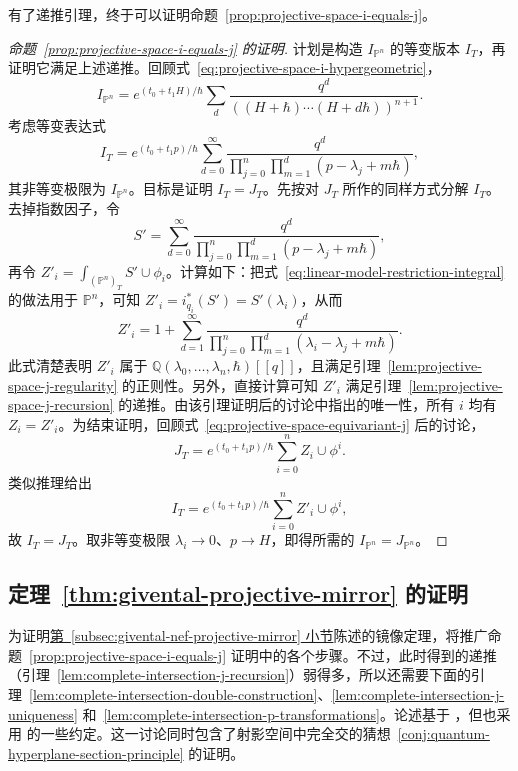有了递推引理，终于可以证明命题~\ref{prop:projective-space-i-equals-j}。
\begin{proof}[命题~\ref{prop:projective-space-i-equals-j} 的证明]
计划是构造 $I_{\mathbb P^n}$ 的等变版本 $I_T$，再证明它满足上述递推。回顾式~\eqref{eq:projective-space-i-hypergeometric}，
\[
I_{\mathbb P^n}=e^{(t_0+t_1H)/\hbar}\sum_d\frac{q^d}{((H+\hbar)\cdots(H+d\hbar))^{n+1}}.
\]
考虑等变表达式
\[
I_T=e^{(t_0+t_1p)/\hbar}\sum_{d=0}^{\infty}\frac{q^d}{\prod_{j=0}^n\prod_{m=1}^d(p-\lambda_j+m\hbar)},
\]
其非等变极限为 $I_{\mathbb P^n}$。目标是证明 $I_T=J_T$。先按对 $J_T$ 所作的同样方式分解 $I_T$。去掉指数因子，令
\[
S'=\sum_{d=0}^{\infty}\frac{q^d}{\prod_{j=0}^n\prod_{m=1}^d(p-\lambda_j+m\hbar)},
\]
再令 $Z'_i=\int_{(\mathbb P^n)_T}S'\cup\phi_i$。计算如下：把式~\eqref{eq:linear-model-restriction-integral} 的做法用于 $\mathbb P^n$，可知 $Z'_i=i_{q_i}^*(S')=S'(\lambda_i)$，从而
\[
Z'_i=1+\sum_{d=1}^{\infty}\frac{q^d}{\prod_{j=0}^n\prod_{m=1}^d(\lambda_i-\lambda_j+m\hbar)}.
\]
此式清楚表明 $Z'_i$ 属于 $\mathbb Q(\lambda_0,\ldots,\lambda_n,\hbar)[[q]]$，且满足引理~\ref{lem:projective-space-j-regularity} 的正则性。另外，直接计算可知 $Z'_i$ 满足引理~\ref{lem:projective-space-j-recursion} 的递推。由该引理证明后的讨论中指出的唯一性，所有 $i$ 均有 $Z_i=Z'_i$。为结束证明，回顾式~\eqref{eq:projective-space-equivariant-j} 后的讨论，
\[
J_T=e^{(t_0+t_1p)/\hbar}\sum_{i=0}^nZ_i\cup\phi^i.
\]
类似推理给出
\[
I_T=e^{(t_0+t_1p)/\hbar}\sum_{i=0}^nZ'_i\cup\phi^i,
\]
故 $I_T=J_T$。取非等变极限 $\lambda_i\to0$、$p\to H$，即得所需的 $I_{\mathbb P^n}=J_{\mathbb P^n}$。
\end{proof}

\subsection{定理~\ref{thm:givental-projective-mirror} 的证明}\label{subsec:givental-general-bundle-proof}
为证明\hyperref[subsec:givental-nef-projective-mirror]{第~\ref*{subsec:givental-nef-projective-mirror} 小节}陈述的镜像定理，将推广命题~\ref{prop:projective-space-i-equals-j} 证明中的各个步骤。不过，此时得到的递推（引理~\ref{lem:complete-intersection-j-recursion}）弱得多，所以还需要下面的引理~\ref{lem:complete-intersection-double-construction}、\ref{lem:complete-intersection-j-uniqueness} 和~\ref{lem:complete-intersection-p-transformations}。论述基于 ，但也采用  的一些约定。这一讨论同时包含了射影空间中完全交的猜想~\ref{conj:quantum-hyperplane-section-principle} 的证明。

